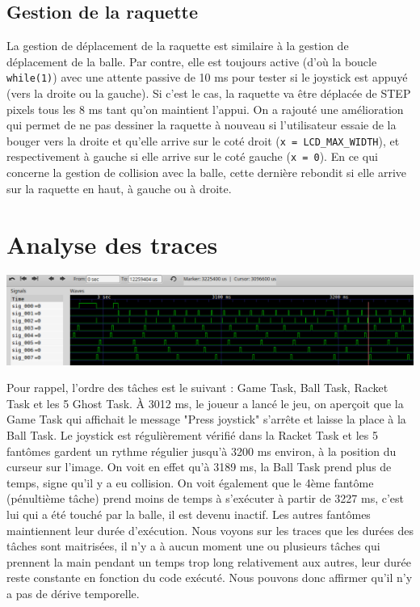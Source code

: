 \documentclass[a4paper]{article}
\begin{document}
\subsection{Gestion de la raquette}
La gestion de déplacement de la raquette est similaire à la gestion de déplacement de la balle. Par contre,
elle est toujours active (d'où la boucle \texttt{while(1)}) avec une attente passive de 10 ms pour tester
si le joystick est appuyé (vers la droite ou la gauche). Si c'est le cas, la raquette va être déplacée de STEP
pixels tous les 8 ms tant qu'on maintient l'appui. On a rajouté une amélioration qui permet de ne pas dessiner
la raquette à nouveau si l'utilisateur essaie de la bouger vers la droite et qu'elle arrive sur le coté droit
(\texttt{x = LCD_MAX_WIDTH}), et respectivement à gauche si elle arrive sur le coté gauche (\texttt{x = 0}).
\newline
En ce qui concerne la gestion de collision avec la balle, cette dernière rebondit si elle arrive sur la raquette
en haut, à gauche ou à droite.

\section{Analyse des traces}
\begin{center}
\includegraphics[scale=0.455]{images/traces5.png}
\end{center}
Pour rappel, l'ordre des tâches est le suivant : Game Task, Ball Task, Racket Task et les 5 Ghost Task.
À 3012 ms, le joueur a lancé le jeu, on aperçoit que la Game Task qui affichait le message "Press joystick"
s'arrête et laisse la place à la Ball Task. Le joystick est régulièrement vérifié dans la Racket Task et les
5 fantômes gardent un rythme régulier jusqu'à 3200 ms environ, à la position du curseur sur l'image. On voit
en effet qu'à 3189 ms, la Ball Task prend plus de temps, signe qu'il y a eu collision. On voit également que
le 4ème fantôme (pénultième tâche) prend moins de temps à s'exécuter à partir de 3227 ms, c'est lui qui a été
touché par la balle, il est devenu inactif. Les autres fantômes maintiennent leur durée d'exécution.
\newline
Nous voyons sur les traces que les durées des tâches sont maitrisées, il n'y a à aucun moment une ou plusieurs
tâches qui prennent la main pendant un temps trop long relativement aux autres, leur durée reste constante en
fonction du code exécuté. Nous pouvons donc affirmer qu’il n’y a pas de dérive temporelle.
\end{document}
